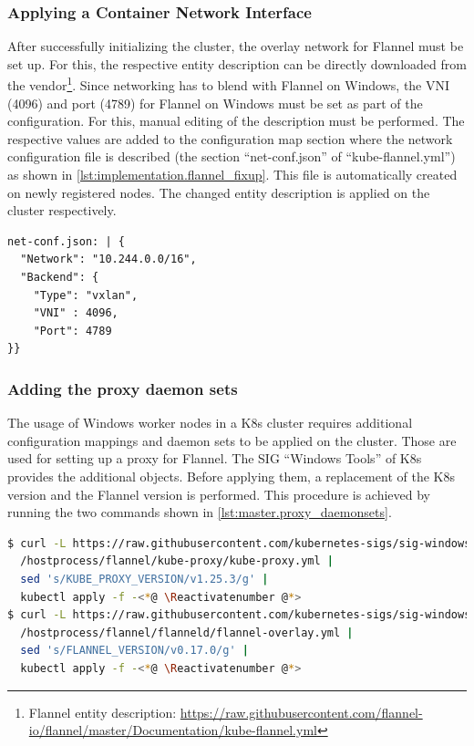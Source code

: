 \subsubsection{Applying a Container Network Interface}
After successfully initializing the cluster, the overlay network for Flannel must be set up.
For this, the respective entity description can be directly downloaded from the vendor\footnote{Flannel entity description: \href{https://raw.githubusercontent.com/flannel-io/flannel/master/Documentation/kube-flannel.yml}{https://raw.githubusercontent.com/flannel-io/flannel/master/Documentation/kube-flannel.yml}}. Since networking has to blend with Flannel on \ac{Windows}, the \ac{VNI} (4096) and port (4789) for Flannel on \ac{Windows} must be set as part of the configuration. For this, manual editing of the description must be performed. The respective values are added to the configuration map section where the network configuration file is described (the section \enquote{net-conf.json} of \enquote{kube-flannel.yml}) as shown in \autoref{lst:implementation.flannel_fixup}. This file is automatically created on newly registered nodes. The changed entity description is applied on the cluster respectively.
\begin{lstlisting}[label=lst:implementation.flannel_fixup, caption={Fixup for Flannel manifest. Here the values \tcode{VNI} and \tcode{Port} were added. (\textit{kube-flannel.yml})}]
net-conf.json: | {
  "Network": "10.244.0.0/16",
  "Backend": {
    "Type": "vxlan",
    "VNI" : 4096,
    "Port": 4789
}}
\end{lstlisting}
\vspace{-2em}
\subsubsection{Adding the proxy daemon sets}\vspace{-1em}
The usage of \ac{Windows} worker nodes in a \ac{K8s} cluster requires additional configuration mappings and daemon sets to be applied on the cluster. Those are used for setting up a proxy for Flannel. The \ac{SIG} \enquote{Windows Tools} of \ac{K8s} provides the additional objects\cite{GitHubKubernetesSIGWindowsTools.20230213}. Before applying them, a replacement of the \ac{K8s} version and the Flannel version is performed. This procedure is achieved by running the two commands shown in \autoref{lst:master.proxy_daemonsets}. 
\begin{lstlisting}[label=lst:master.proxy_daemonsets, caption={Bash command for adding the flannel overlay configuration\cite{GitHubKubernetesSIGWindowsTools.20230213}}, language=bash]
$ curl -L https://raw.githubusercontent.com/kubernetes-sigs/sig-windows-tools/master \<*@ \Suppressnumber @*>
  /hostprocess/flannel/kube-proxy/kube-proxy.yml | 
  sed 's/KUBE_PROXY_VERSION/v1.25.3/g' | 
  kubectl apply -f -<*@ \Reactivatenumber @*>
$ curl -L https://raw.githubusercontent.com/kubernetes-sigs/sig-windows-tools/master \<*@ \Suppressnumber @*>
  /hostprocess/flannel/flanneld/flannel-overlay.yml | 
  sed 's/FLANNEL_VERSION/v0.17.0/g' | 
  kubectl apply -f -<*@ \Reactivatenumber @*>
\end{lstlisting}


